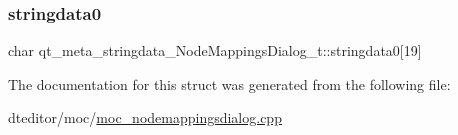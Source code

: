 \subsubsection{\texorpdfstring{stringdata0}{stringdata0}}
{\footnotesize\ttfamily char qt\+\_\+meta\+\_\+stringdata\+\_\+\+Node\+Mappings\+Dialog\+\_\+t\+::stringdata0\mbox{[}19\mbox{]}}



The documentation for this struct was generated from the following file\+:\begin{DoxyCompactItemize}
\item 
dteditor/moc/\mbox{\hyperlink{moc__nodemappingsdialog_8cpp}{moc\+\_\+nodemappingsdialog.\+cpp}}\end{DoxyCompactItemize}

